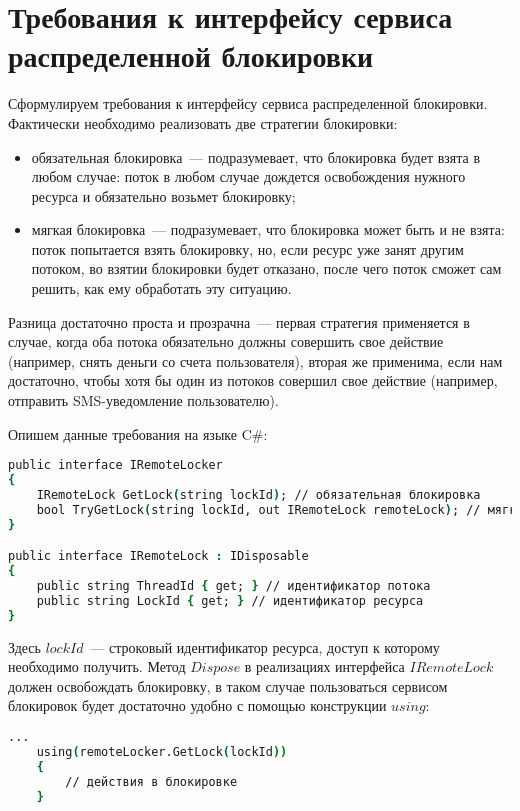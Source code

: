 \section{Требования к интерфейсу сервиса распределенной блокировки}

Сформулируем требования к интерфейсу сервиса распределенной блокировки. Фактически необходимо реализовать две стратегии блокировки:

\begin{itemize} 
	\item обязательная блокировка~--- подразумевает, что блокировка будет взята в любом случае: поток в любом случае дождется освобождения нужного ресурса и обязательно возьмет блокировку;
	\item мягкая блокировка~--- подразумевает, что блокировка может быть и не взята: поток попытается взять блокировку, но, если ресурс уже занят другим потоком, во взятии блокировки будет отказано, после чего поток сможет сам решить, как ему обработать эту ситуацию.
\end{itemize}

Разница достаточно проста и прозрачна~--- первая стратегия применяется в случае, когда оба потока обязательно должны совершить свое действие (например, снять деньги со счета пользователя), вторая же применима, если нам достаточно, чтобы хотя бы один из потоков совершил свое действие (например, отправить SMS-уведомление пользователю). 

Опишем данные требования на языке C\#:

\begin{lstlisting}[language=csh,caption={Описание интерфейса}]
public interface IRemoteLocker
{
	IRemoteLock GetLock(string lockId); // обязательная блокировка
	bool TryGetLock(string lockId, out IRemoteLock remoteLock); // мягкая блокировка
}

public interface IRemoteLock : IDisposable
{
	public string ThreadId { get; } // идентификатор потока
	public string LockId { get; } // идентификатор ресурса
}
\end{lstlisting}

Здесь $lockId$~--- строковый идентификатор ресурса, доступ к которому необходимо получить. Метод $Dispose$ в реализациях интерфейса $IRemoteLock$ должен освобождать блокировку, в таком случае пользоваться сервисом блокировок будет достаточно удобно с помощью конструкции $using$:

\begin{lstlisting}[language=csh,caption={Использование конструкции using}]
	...
	using(remoteLocker.GetLock(lockId))
	{
		// действия в блокировке
	}
\end{lstlisting}
